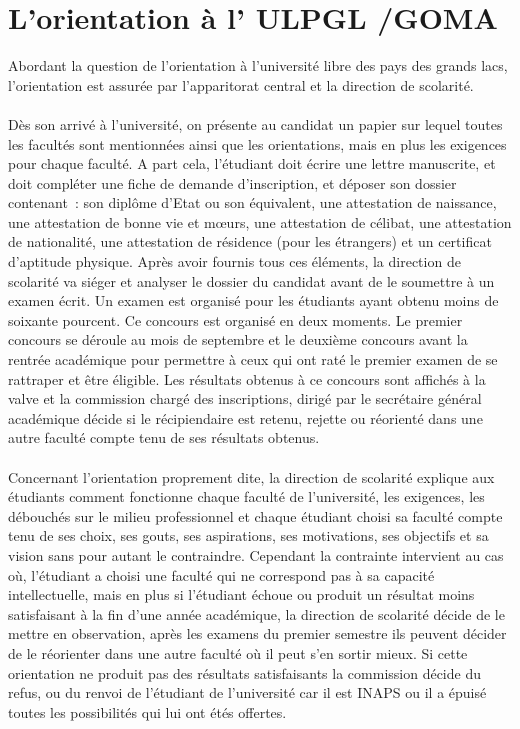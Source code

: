 \section{L'orientation à l' \ac{ULPGL} /GOMA  \cite{OrBk6} }
Abordant la question de l’orientation à l’université libre des pays des grands lacs, l’orientation est assurée par l’apparitorat  central et la direction de scolarité. 
\paragraph{}
Dès son arrivé à l’université, on présente au candidat un papier sur lequel toutes les facultés sont mentionnées ainsi que les orientations, mais en plus les exigences pour chaque faculté. 
 A part cela, l’étudiant doit écrire une lettre manuscrite, et doit compléter une fiche de demande d’inscription, et déposer son dossier contenant : son diplôme d’Etat ou son équivalent, une attestation de naissance, une attestation de bonne vie et mœurs, une attestation de célibat, une attestation de nationalité, une attestation de résidence  (pour les étrangers) et un certificat d’aptitude physique. Après avoir fournis tous ces éléments, la direction de scolarité va siéger et analyser le dossier du candidat avant de le soumettre à un examen écrit.   
Un examen est organisé pour les étudiants ayant obtenu moins de soixante pourcent. Ce concours est organisé en deux moments. Le premier concours se déroule au mois de septembre et le deuxième concours avant la rentrée académique  pour permettre à ceux qui ont raté le premier examen de se rattraper et être éligible. Les résultats obtenus à ce concours sont affichés à la valve et la commission chargé des inscriptions, dirigé par le secrétaire général académique décide si le récipiendaire est retenu, rejette ou réorienté dans une autre faculté compte tenu de ses résultats obtenus. 
\paragraph{}
Concernant l’orientation proprement dite, la direction de scolarité explique aux étudiants comment fonctionne chaque faculté de l’université, les exigences, les débouchés sur le milieu professionnel et chaque étudiant choisi sa faculté compte tenu de ses choix, ses gouts, ses aspirations, ses motivations, ses objectifs et sa vision sans pour autant le contraindre. Cependant la contrainte intervient au cas où, l’étudiant a choisi une faculté qui ne correspond pas à sa capacité intellectuelle, mais en plus si l’étudiant échoue ou produit un résultat moins satisfaisant à la fin d’une année académique, la direction de scolarité décide de le mettre en  observation, après les examens du premier semestre ils peuvent décider de le réorienter dans une autre faculté où il peut s’en sortir mieux.  Si cette orientation ne produit pas des résultats satisfaisants la commission décide du refus, ou du renvoi de l’étudiant de l’université car il est  \ac{INAPS} ou il a épuisé toutes les possibilités qui lui ont étés offertes. 

